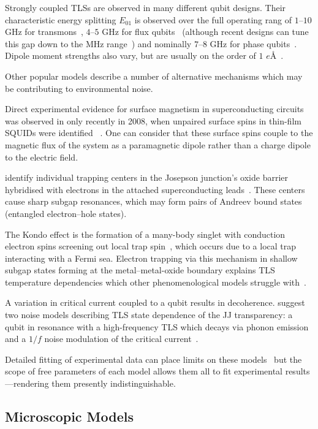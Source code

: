 Strongly coupled TLSs are observed in many different qubit designs.
Their characteristic energy splitting $E_{01}$ is observed over the full operating rang of $1$--$10$ GHz for transmons~\cite{Koch2007}, $4$--$5$ GHz for flux qubits~\cite{Lupascu2009} (although recent designs can tune this gap down to the MHz range~\cite{Schwarz2013}) and nominally $7$--$8$ GHz for phase qubits~\cite{Cole2010}.
Dipole moment strengths also vary, but are usually on the order of $1$ $e$\AA\ \cite{Cole2010,Shalibo2010}.

\divtext

Other popular models describe a number of alternative mechanisms which may be contributing to environmental noise. 

Direct experimental evidence for surface magnetism in superconducting circuits was observed in only recently in 2008, when unpaired surface spins in thin-film SQUIDs were identified ~\cite{Sendelbach2008}.
One can consider that these surface spins couple to the magnetic flux of the system as a paramagnetic dipole rather than a charge dipole to the electric field.

\citeauthor{DeSousa2009} identify individual trapping centers in the Josepson junction's oxide barrier hybridised with electrons in the attached superconducting leads~\cite{DeSousa2009}.
These centers cause sharp subgap resonances, which may form pairs of Andreev bound states (entangled electron--hole states).

The Kondo effect is  the formation of a many-body singlet with conduction electron spins screening out local trap spin~\cite{Wilson1975}, which occurs due to a local trap interacting with a Fermi sea.
Electron trapping via this mechanism in shallow subgap states forming at the metal--metal-oxide boundary explains TLS temperature dependencies which other phenomenological models struggle with~\cite{Faoro2007}.

A variation in critical current coupled to a qubit results in decoherence.
\citeauthor{Ku2005} suggest two noise models describing TLS state dependence of the JJ transparency: a qubit in resonance with a high-frequency TLS which decays via phonon emission and a $1/f$ noise modulation of the critical current~\cite{Ku2005}.

Detailed fitting of experimental data can place limits on these models~\cite{Cole2010} but the scope of free parameters of each model allows them all to fit experimental results---rendering them presently indistinguishable.

\subsection{Microscopic Models}\label{sec:micromod}

